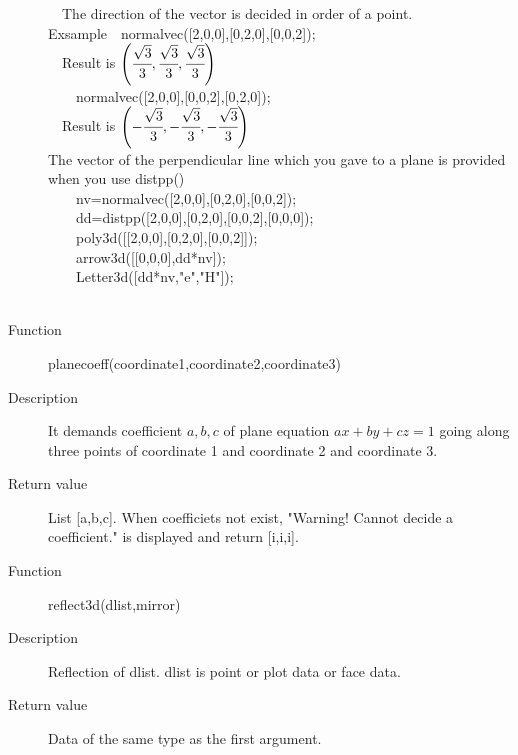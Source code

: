 \documentclass[papersize,a4paper,12pt]{article}
\begin{document}
\begin{description}
　The direction of the vector is decided in order of a point.\\
Exsample　normalvec([2,0,0],[0,2,0],[0,0,2]);\\
 　Result is  $\left(\cfrac{\sqrt{3}}{3},\cfrac{\sqrt{3}}{3},\cfrac{\sqrt{3}}{3}\right)$\\
　　normalvec([2,0,0],[0,0,2],[0,2,0]); \\
　Result is  $\left(-\cfrac{\sqrt{3}}{3},-\cfrac{\sqrt{3}}{3},-\cfrac{\sqrt{3}}{3}\right)$\\

The vector of the perpendicular line which you gave to a plane is provided when you use distpp()\\

　　nv=normalvec([2,0,0],[0,2,0],[0,0,2]);\\
　　dd=distpp([2,0,0],[0,2,0],[0,0,2],[0,0,0]);\\
　　poly3d([[2,0,0],[0,2,0],[0,0,2]]);\\
　　arrow3d([[0,0,0],dd*nv]);\\
　　Letter3d([dd*nv,"e","H"]);\\

　　\\




\hypertarget{planecoeff}{}
\item[Function] planecoeff(coordinate1,coordinate2,coordinate3)
\item[Description] It demands coefficient $a,b,c$ of plane equation $ax+by+cz=1$ going along three points of coordinate 1 and coordinate 2 and coordinate 3.
\item[Return value] List [a,b,c]. When coefficiets not exist, "Warning! Cannot decide a coefficient." is displayed and return [i,i,i].\\


\vspace{\baselineskip}
\hypertarget{reflect3d}{}
\item[Function] reflect3d(dlist,mirror) 
\item[Description] Reflection of dlist.  dlist is point or plot data or face data.
\item[Return value]  Data of the same type as the first argument.

\vspace{\baselineskip}


\end{description}
\end{document}
